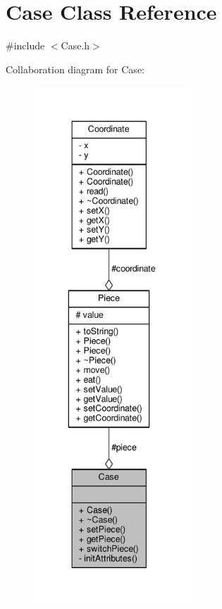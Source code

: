 \hypertarget{class_case}{}\section{Case Class Reference}
\label{class_case}


{\ttfamily \#include $<$Case.\+h$>$}



Collaboration diagram for Case\+:
\nopagebreak
\begin{figure}[H]
\begin{center}
\leavevmode
\includegraphics[height=550pt]{class_case__coll__graph}
\end{center}
\end{figure}
